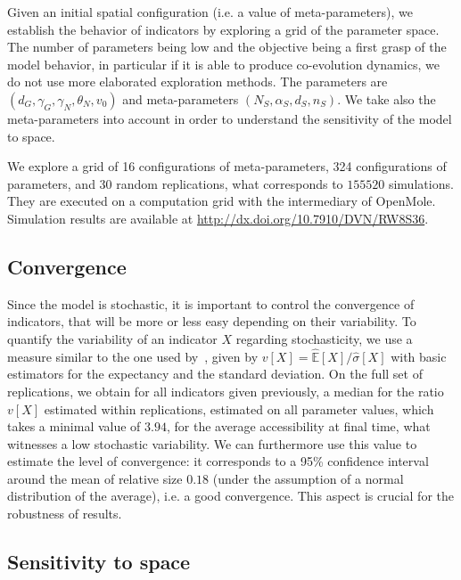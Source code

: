 Given an initial spatial configuration (i.e. a value of meta-parameters), we establish the behavior of indicators by exploring a grid of the parameter space. The number of parameters being low and the objective being a first grasp of the model behavior, in particular if it is able to produce co-evolution dynamics, we do not use more elaborated exploration methods. The parameters are $(d_G,\gamma_G,\gamma_N,\theta_N,v_0)$ and meta-parameters $(N_S,\alpha_S,d_S,n_S)$. We take also the meta-parameters into account in order to understand the sensitivity of the model to space.


We explore a grid of 16 configurations of meta-parameters, 324 configurations of parameters, and 30 random replications, what corresponds to $155520$ simulations. They are executed on a computation grid with the intermediary of OpenMole. Simulation results are available at \url{http://dx.doi.org/10.7910/DVN/RW8S36}.


\subsection{Convergence}

Since the model is stochastic, it is important to control the convergence of indicators, that will be more or less easy depending on their variability. To quantify the variability of an indicator $X$ regarding stochasticity, we use a measure similar to the one used by~\cite{raimbault2018calibration}, given by $v\left[X\right] = \hat{\mathbb{E}}\left[X\right]/\hat{\sigma}\left[X\right]$ with basic estimators for the expectancy and the standard deviation. On the full set of replications, we obtain for all indicators given previously, a median for the ratio $v\left[X\right]$ estimated within replications, estimated on all parameter values, which takes a minimal value of $3.94$, for the average accessibility at final time, what witnesses a low stochastic variability. We can furthermore use this value to estimate the level of convergence: it corresponds to a 95\% confidence interval around the mean of relative size $0.18$ (under the assumption of a normal distribution of the average), i.e. a good convergence. This aspect is crucial for the robustness of results.


\subsection{Sensitivity to space}

